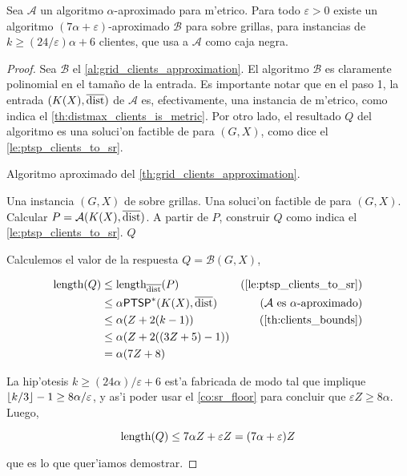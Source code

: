 \begin{theorem}
\label{th:grid_clients_approximation}
Sea $\mathcal{A}$ un algoritmo $\alpha$-aproximado para  m'etrico. Para todo $\varepsilon > 0$ existe un algoritmo $(7\alpha + \varepsilon)$-aproximado $\mathcal{B}$ para  sobre grillas, para instancias de $k \geq (24 / \varepsilon) \alpha + 6$ clientes, que usa a $\mathcal{A}$ como caja negra.

\begin{proof}
Sea $\mathcal{B}$ el \autoref{al:grid_clients_approximation}. El algoritmo $\mathcal{B}$ es claramente polinomial en el tama\~no de la entrada. Es importante notar que en el paso 1, la entrada $(K(X), \overline{\textnormal{dist}})$ de $\mathcal{A}$ es, efectivamente, una instancia de  m'etrico, como indica el \autoref{th:distmax_clients_is_metric}. Por otro lado, el resultado $Q$ del algoritmo es una soluci'on factible de  para $(G, X)$, como dice el \autoref{le:ptsp_clients_to_sr}.

\begin{algorithm}
  \caption{Algoritmo aproximado del \autoref{th:grid_clients_approximation}.}
  \label{al:grid_clients_approximation}
  \begin{algorithmic}[1]
  	\Require Una instancia $(G, X)$ de  sobre grillas.
  	\Ensure Una soluci'on factible de  para $(G, X)$.
  	\State Calcular $P = \mathcal{A}(K(X), \overline{\textnormal{dist}})$.
	\State A partir de $P$, construir $Q$ como indica el \autoref{le:ptsp_clients_to_sr}.
	\Return $Q$
  \end{algorithmic}
\end{algorithm}

Calculemos el valor de la respuesta $Q = \mathcal{B}(G, X)$,

\begin{align*}
\length(Q) &\leq \length_{\distmax}(P) & \text{(\autoref{le:ptsp_clients_to_sr})}\\
&\leq \alpha \problem{PTSP}^*(K(X), \distmax) & \text{(} \mathcal{A} \text{ es } \alpha \text{-aproximado)}\\
&\leq \alpha (Z + 2(k - 1)) & \text{(\autoref{th:clients_bounds})}\\
&\leq \alpha (Z + 2((3Z + 5) - 1)) & \\
&= \alpha (7Z + 8)
\end{align*}

\noindent
La hip'otesis $k \geq (24 \alpha) / \varepsilon + 6$ est'a fabricada de modo tal que implique $\left\lfloor k / 3 \right\rfloor - 1 \geq 8 \alpha / \varepsilon$, y as'i poder usar el \autoref{co:sr_floor} para concluir que $\varepsilon Z \geq 8 \alpha$. Luego,

\[\textnormal{length}(Q) \leq 7\alpha Z + \varepsilon Z = (7 \alpha + \varepsilon) Z\]

\noindent
que es lo que quer'iamos demostrar.
\end{proof}
\end{theorem}

